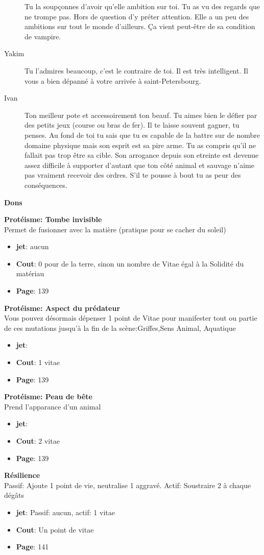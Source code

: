 \documentclass[oneside,12pt]{book}
\newcommand\don[5]{
\textbf{#1} \\
#2
\begin{itemize}
\item{ \textbf{jet}: #3}
\item{ \textbf{Cout}: #4}
\item{ \textbf{Page}: #5}
\end{itemize}
\vspace{0.5cm}
}
\begin{document}
\begin{flushleft}
\begin{description}
{Tu la soupçonnes d'avoir qu'elle ambition sur toi. Tu as vu des regards que ne trompe pas. Hors de question d'y préter attention. Elle a un peu des ambitions sur tout le monde d'ailleurs. Ça vient peut-être de sa condition de vampire. }
\item[Yakim]{Tu l'admires beaucoup, c'est le contraire de toi. Il est très intelligent. Il vous a bien dépanné à votre arrivée à saint-Petersbourg.    }
\item[Ivan]{Ton meilleur pote et accessoirement ton beauf. Tu aimes bien le défier par des petits jeux (course ou bras de fer). Il te laisse souvent gagner, tu penses.
Au fond de toi tu sais que tu es capable de la battre sur de nombre domaine physique mais son esprit est sa pire arme. Tu as compris qu'il ne fallait pas trop être sa cible. Son arrogance depuis son etreinte est devenue assez difficile à supporter d'autant que ton côté animal et sauvage n'aime pas vraiment recevoir des ordres. S'il te pousse à bout tu as peur des conséquences.}
\end{description}
 
\clearpage
\textbf{\large Dons}
\vspace{0.5cm}

\don{Protéisme: Tombe invisible}{Permet de fusionner avec la matière (pratique pour se cacher du soleil)}{aucun}{0 pour de la terre, sinon un nombre de Vitae égal à la Solidité du matériau}{139}
\don{Protéisme: Aspect du prédateur}{Vous pouvez désormais dépenser 1 point de Vitae pour
manifester tout ou partie de ces mutations jusqu’à la fin de la scène:Griffes,Sens Animal, Aquatique}{}{1 vitae}{139}
\don{Protéisme: Peau de bête}{Prend l’apparance d’un animal}{}{2 vitae}{139}
\don{Résilience}{Passif: Ajoute 1 point de vie, neutralise 1 aggravé. Actif: Soustraire 2 à chaque dégâts}{Passif: aucun, actif: 1 vitae}{Un point de vitae}{141}


\clearpage

\end{flushleft}
\end{document}
